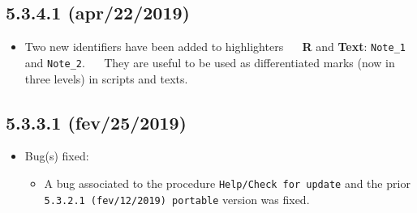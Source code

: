 \subsection*{5.3.4.1 (apr/22/2019)}
\begin{itemize}
  \item Two new identifiers have been added to highlighters
   \textbf{R} and \textbf{Text}: \texttt{Note\_1} and \texttt{Note\_2}.
   They are useful to be used as differentiated marks (now in three levels) in scripts and texts.
\end{itemize}

\subsection*{5.3.3.1 (fev/25/2019)}
\begin{itemize}
  \item Bug(s) fixed:
    \begin{itemize}
      \item A bug associated to the procedure \texttt{Help/Check for update} and the prior
        \texttt{5.3.2.1 (fev/12/2019) portable} version was fixed.
    \end{itemize}
\end{itemize}
